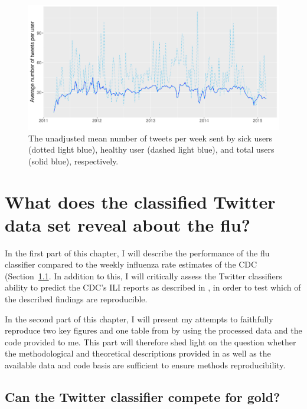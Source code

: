 \documentclass[11pt, a4paper,twoside]{report}\usepackage[]{graphicx}\usepackage[]{color}
\begin{document}
\begin{figure}[htbp!]
\centering
\includegraphics[width=1\linewidth]{10_avg_tw_sick_healthy.pdf}
\caption{The unadjusted mean number of tweets per week sent by sick users (dotted light blue), healthy user (dashed light blue), and total users (solid blue), respectively.}
\label{fig:avg_tw_diff}
\end{figure}

\thispagestyle{empty}
\cleardoublepage

\chapter{What does the classified Twitter data set reveal about the flu?}
\label{ch:results}

In the first part of this chapter, I will describe the performance of the flu classifier compared to the weekly influenza rate estimates of the CDC (Section~\ref{sec:comparison_cdc}. In addition to this, I will critically assess the Twitter classifiers ability to predict the CDC's ILI reports as described in \cite{bodnar_data_2015}, in order to test which of the described findings are reproducible.

In the second part of this chapter, I will present my attempts to faithfully reproduce two key figures and one table from \cite{bodnar_data_2015} by using the processed data and the code provided to me. This part will therefore shed light on the question whether the methodological and theoretical descriptions provided in \cite{bodnar_data_2015} as well as the available data and code basis are sufficient to ensure methods reproducibility.

\section{Can the Twitter classifier compete for gold?}
\label{sec:comparison_cdc}
\end{document}
